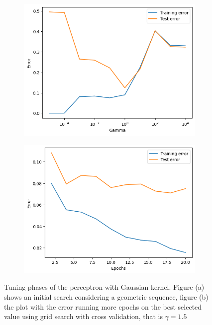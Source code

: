 \documentclass{article}
\begin{document}
\begin{figure}
	\centering
	\begin{subfigure}{0.45\columnwidth}
		\centering
		\includegraphics[width=\columnwidth]{../plots/kgauss_perceptron.png}
		\caption{}
		\label{subfig:kgauss_perceptron}
	\end{subfigure}
	\begin{subfigure}{0.45\columnwidth}
		\centering
		\includegraphics[width=\columnwidth]{../plots/kgauss2_perceptron.png}
		\caption{}
		\label{subfig:kgauss2_perceptron}
	\end{subfigure}
	\caption{Tuning phases of the perceptron with Gaussian kernel. Figure (a) shows an initial search considering a geometric sequence, figure (b) the plot with the error running more epochs on the best selected value using grid search with cross validation, that is $\gamma=1.5$}
	\label{fig:kgauss_perceptron}
\end{figure}
\end{document}
